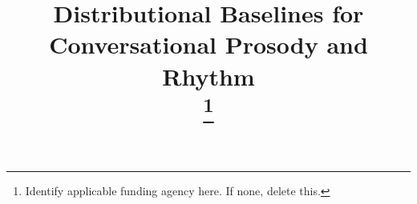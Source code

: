 \documentclass[conference]{IEEEtran}
\begin{document}
\title{Distributional Baselines for Conversational Prosody and Rhythm\\
\thanks{Identify applicable funding agency here. If none, delete this.}
}

\author{
}

\end{document}
